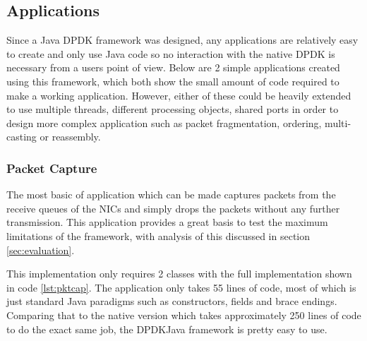 \documentclass[final_report.tex]{subfiles}
\begin{document}
\subsection{Applications}
\label{sec:apps}
Since a Java DPDK framework was designed, any applications are relatively easy to create and only use Java code so no interaction with the native DPDK is necessary from a users point of view. Below are 2 simple applications created using this framework, which both show the small amount of code required to make a working application. However, either of these could be heavily extended to use multiple threads, different processing objects, shared ports in order to design more complex application such as packet fragmentation, ordering, multi-casting or reassembly.

\subsubsection{Packet Capture}
The most basic of application which can be made captures packets from the receive queues of the NICs and simply drops the packets without any further transmission. This application provides a great basis to test the maximum limitations of the framework, with analysis of this discussed in section \ref{sec:evaluation}.

This implementation only requires 2 classes with the full implementation shown in code \ref{lst:pktcap}. The application only takes 55 lines of code, most of which is just standard Java paradigms such as constructors, fields and brace endings. Comparing that to the native version which takes approximately 250 lines of code to do the exact same job, the DPDKJava framework is pretty easy to use.
\end{document}
